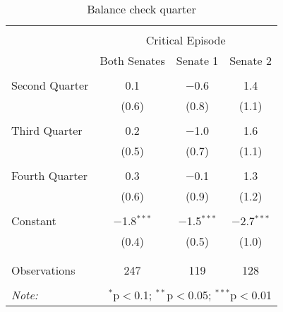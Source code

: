 
\begin{table}[!htbp] \centering 
  \caption{Balance check quarter} 
  \label{rob_month} 
\begin{tabular}{@{\extracolsep{5pt}}lccc} 
\\[-1.8ex]\hline 
\hline \\[-1.8ex] 
 & \multicolumn{3}{c}{Critical Episode} \\ 
\cline{2-4} 
 & Both Senates & Senate 1 & Senate 2 \\ 
\hline \\[-1.8ex] 
 Second Quarter & 0.1 & $-$0.6 & 1.4 \\ 
  & (0.6) & (0.8) & (1.1) \\ 
  & & & \\ 
 Third Quarter & 0.2 & $-$1.0 & 1.6 \\ 
  & (0.5) & (0.7) & (1.1) \\ 
  & & & \\ 
 Fourth Quarter & 0.3 & $-$0.1 & 1.3 \\ 
  & (0.6) & (0.9) & (1.2) \\ 
  & & & \\ 
 Constant & $-$1.8$^{***}$ & $-$1.5$^{***}$ & $-$2.7$^{***}$ \\ 
  & (0.4) & (0.5) & (1.0) \\ 
  & & & \\ 
\hline \\[-1.8ex] 
Observations & 247 & 119 & 128 \\ 
\hline 
\hline \\[-1.8ex] 
\textit{Note:}  & \multicolumn{3}{r}{$^{*}$p$<$0.1; $^{**}$p$<$0.05; $^{***}$p$<$0.01} \\ 
\end{tabular} 
\end{table} 
